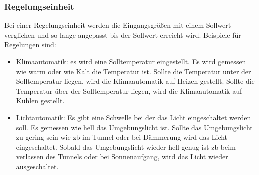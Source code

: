 \subsubsection{Regelungseinheit}
Bei einer Regelungseinheit werden die Eingangsgrößen mit einem Sollwert verglichen und so lange angepasst bis der Sollwert erreicht wird.
Beispiele für Regelungen sind:
\begin{itemize}
	\item Klimaautomatik: es wird eine Solltemperatur eingestellt.
	      Es wird gemessen wie warm oder wie Kalt die Temperatur ist.
	      Sollte die Temperatur unter der Solltemperatur liegen, wird die Klimaautomatik auf Heizen gestellt.
	      Sollte die Temperatur über der Solltemperatur liegen, wird die Klimaautomatik auf Kühlen gestellt.
	\item Lichtautomatik: Es gibt eine Schwelle bei der das Licht eingeschaltet werden soll.
	      Es gemessen wie hell das Umgebungslicht ist.
	      Sollte das Umgebungslicht zu gering sein wie \ac*{zb} im Tunnel oder bei Dämmerung wird das Licht eingeschaltet.
	      Sobald das Umgebungslicht wieder hell genug ist \ac*{zb} beim verlassen des Tunnels oder bei Sonnenaufgang, wird das Licht wieder ausgeschaltet.
\end{itemize}
